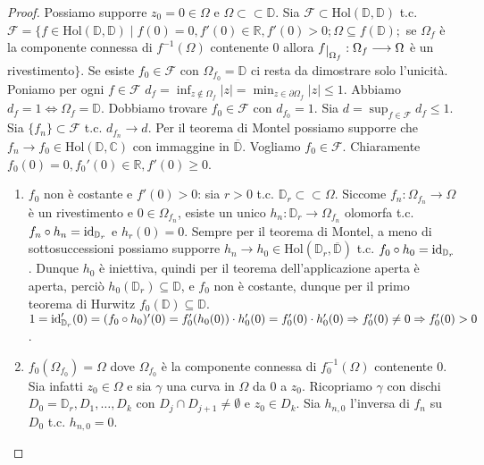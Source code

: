 \begin{proof}
  Possiamo supporre $z_0=0 \in \Omega$ e $\Omega \subset \subset \mathbb{D}$. Sia $\mathcal{F} \subset \text{Hol}(\mathbb{D}, \mathbb{D})$ t.c.
  $\mathcal{F}=\{f \in \text{Hol}(\mathbb{D}, \mathbb{D}) \mid f(0)=0, f'(0) \in \mathbb{R}, f'(0)>0; \Omega \subseteq f(\mathbb{D});$ se $\Omega_f$ è la componente connessa di $f^{-1}(\Omega)$ contenente $0$ allora $f\restrict{\Omega_f}:\Omega_f \longrightarrow \Omega$ è un rivestimento$\}$.
  Se esiste $f_0 \in \mathcal{F}$ con $\Omega_{f_0}=\mathbb{D}$ ci resta da dimostrare solo l'unicità. Poniamo per ogni $f \in \mathcal{F}$ $\displaystyle d_f=\inf_{z \not\in \Omega_f} |z|=\min_{z \in \partial\Omega_f} |z| \le 1$. Abbiamo $d_f=1 \iff \Omega_f=\mathbb{D}$.
  Dobbiamo trovare $f_0 \in \mathcal{F}$ con $d_{f_0}=1$. Sia $\displaystyle d=\sup_{f \in \mathcal{F}} d_f \le 1$. Sia $\{f_n\} \subset \mathcal{F}$ t.c. $d_{f_n} \longrightarrow d$.
  Per il teorema di Montel possiamo supporre che $f_n \longrightarrow f_0 \in \text{Hol}(\mathbb{D}, \mathbb{C})$ con immaggine in $\overline {\mathbb{D}}$. Vogliamo $f_0 \in \mathcal{F}$. Chiaramente $f_0(0)=0, f_0'(0) \in \mathbb{R}, f'(0) \ge 0$.
  \begin{enumerate}
    \item $f_0$ non è costante e $f'(0)>0$: sia $r>0$ t.c. $\mathbb{D}_r \subset \subset \Omega$. Siccome $f_n:\Omega_{f_n} \longrightarrow \Omega$ è un rivestimento e $0 \in \Omega_{f_n}$, esiste un unico $h_n:\mathbb{D}_r \longrightarrow \Omega_{f_n}$ olomorfa t.c. $f_n \circ h_n=\operatorname{id}_{\mathbb{D}_r}$ e $h_r(0)=0$.
    Sempre per il teorema di Montel, a meno di sottosuccessioni possiamo supporre $h_n \longrightarrow h_0 \in \text{Hol}(\mathbb{D}_r, \overline{\mathbb{D}})$ t.c. $f_0 \circ h_0=\operatorname{id}_{\mathbb{D}_r}$.
    Dunque $h_0$ è iniettiva, quindi per il teorema dell'applicazione aperta è aperta, perciò $h_0(\mathbb{D}_r) \subseteq \mathbb{D}$, e $f_0$ non è costante, dunque per il primo teorema di Hurwitz $f_0(\mathbb{D}) \subseteq \mathbb{D}$. $1=\operatorname{id}_{\mathbb{D}_r}'(0)=(f_0 \circ h_0)'(0)=f_0'(h_0(0))\cdot h_0'(0)=f_0'(0) \cdot h_0'(0) \Rightarrow f_0'(0) \not=0 \Rightarrow f_0'(0)>0$.
    \item $f_0(\Omega_{f_0})=\Omega$ dove $\Omega_{f_0}$ è la componente connessa di $f_0^{-1}(\Omega)$ contenente $0$. Sia infatti $z_0 \in \Omega$ e sia $\gamma$ una curva in $\Omega$ da $0$ a $z_0$.
    Ricopriamo $\gamma$ con dischi $D_0=\mathbb{D}_r, D_1, \dots, D_k$ con $D_j \cap D_{j+1} \not=\emptyset$ e $z_0 \in D_k$. Sia $h_{n, 0}$ l'inversa di $f_n$ su $D_0$ t.c. $h_{n,0}=0$.

\end{enumerate}
\end{proof}
